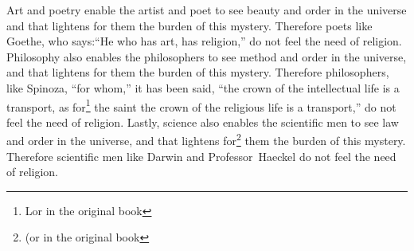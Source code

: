 Art and poetry enable the artist and poet to see beauty and order in the universe and that lightens for them the burden of this mystery.
Therefore poets like Goethe, who says:``He who has art, has religion,'' do not feel the need of religion.
Philosophy also enables the philosophers to see method and order in the universe, and that lightens for them the burden of this mystery.
Therefore philosophers, like Spinoza,  ``for whom,'' it has been said, ``the crown of the intellectual life is a transport, as for\footnote{Lor in the original book} the saint the crown of the religious life is a transport,'' do not feel the need of religion.
Lastly, science also enables the scientific men to see law and order in the universe, and that lightens for\footnote{(or in the original book} them the burden of this mystery.
Therefore scientific men like Darwin  and Professor~Haeckel  do not feel the need of religion.

